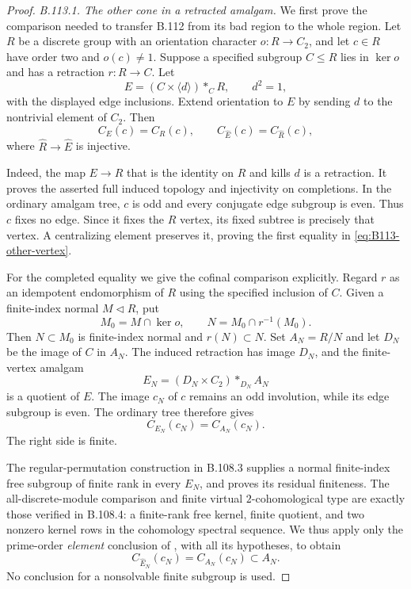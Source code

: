 \begin{proof}
\emph{B.113.1. The other cone in a retracted amalgam.}
We first prove the comparison needed to transfer B.112 from its
bad region to the whole region. Let $R$ be a discrete group with
an orientation character $o:R\to C_2$, and let $c\in R$ have
order two and $o(c)\ne1$. Suppose a specified subgroup $C\le R$
lies in $\ker o$ and has a retraction $r:R\to C$. Let
\[
 E=(C\times\langle d\rangle)*_C R,\qquad d^2=1,
\]
with the displayed edge inclusions. Extend orientation to $E$ by
sending $d$ to the nontrivial element of $C_2$. Then
\begin{equation}\label{eq:B113-other-vertex}
 C_E(c)=C_R(c),\qquad
 C_{\widehat E}(c)=C_{\widehat R}(c),
\end{equation}
where $\widehat R\to\widehat E$ is injective.

Indeed, the map $E\to R$ that is the identity on $R$ and kills
$d$ is a retraction. It proves the asserted full induced topology
and injectivity on completions. In the ordinary amalgam tree,
$c$ is odd and every conjugate edge subgroup is even. Thus $c$
fixes no edge. Since it fixes the $R$ vertex, its fixed subtree
is precisely that vertex. A centralizing element preserves it,
proving the first equality in \eqref{eq:B113-other-vertex}.

For the completed equality we give the cofinal comparison
explicitly. Regard $r$ as an idempotent endomorphism of $R$ using
the specified inclusion of $C$. Given a finite-index normal
$M\triangleleft R$, put
\[
 M_0=M\cap\ker o,\qquad N=M_0\cap r^{-1}(M_0).
\]
Then $N\subset M_0$ is finite-index normal and $r(N)\subset N$.
Set $A_N=R/N$ and let $D_N$ be the image of $C$ in $A_N$.
The induced retraction has image $D_N$, and the finite-vertex
amalgam
\[
 E_N=(D_N\times C_2)*_{D_N}A_N
\]
is a quotient of $E$. The image $c_N$ of $c$ remains an odd
involution, while its edge subgroup is even. The ordinary tree
therefore gives
\[
 C_{E_N}(c_N)=C_{A_N}(c_N).
\]
The right side is finite.

The regular-permutation construction in B.108.3 supplies a normal
finite-index free subgroup of finite rank in every $E_N$, and
proves its residual finiteness. The all-discrete-module comparison
and finite virtual $2$-cohomological type are exactly those verified
in B.108.4: a finite-rank free kernel, finite quotient, and two
nonzero kernel rows in the cohomology spectral sequence. We thus
apply only the prime-order \emph{element} conclusion of
\citet[Theorem~4.3, Sections~4.1--4.2]{BoggiZalesskii2025}, with
all its hypotheses, to obtain
\[
 C_{\widehat E_N}(c_N)=C_{A_N}(c_N)\subset A_N.
\]
No conclusion for a nonsolvable finite subgroup is used.


\end{proof}

